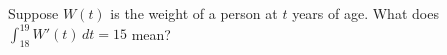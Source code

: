 \documentclass{ximera}
\begin{document}
\begin{shuffle}
\begin{problem}
  Suppose $W(t)$ is the weight of a person at $t$ years of age.  What does $\int_{18}^19 W'(t) \, dt = 15$ mean?
  \begin{multipleChoice}
  \end{multipleChoice}
\end{problem}




\end{shuffle} 
\end{document}
